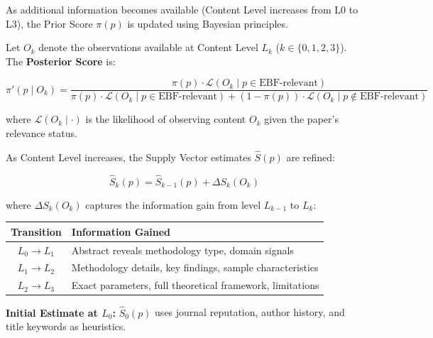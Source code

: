 As additional information becomes available (Content Level increases from L0 to L3),
the Prior Score $\pi(p)$ is updated using Bayesian principles.

\begin{tcolorbox}[colback=blue!5!white, colframe=blue!75!black,
    title=\textbf{Definition 9: Posterior Score}]

Let $O_k$ denote the observations available at Content Level $L_k$ ($k \in \{0,1,2,3\}$).
The \textbf{Posterior Score} is:

\begin{equation}
\pi'(p \mid O_k) = \frac{\pi(p) \cdot \mathcal{L}(O_k \mid p \in \text{EBF-relevant})}
                        {\pi(p) \cdot \mathcal{L}(O_k \mid p \in \text{EBF-relevant}) +
                         (1-\pi(p)) \cdot \mathcal{L}(O_k \mid p \notin \text{EBF-relevant})}
\end{equation}

where $\mathcal{L}(O_k \mid \cdot)$ is the likelihood of observing content $O_k$ given
the paper's relevance status.
\end{tcolorbox}

\begin{tcolorbox}[colback=blue!5!white, colframe=blue!75!black,
    title=\textbf{Definition 10: Supply Vector Update Function}]

As Content Level increases, the Supply Vector estimates $\hat{S}(p)$ are refined:

\begin{equation}
\hat{S}_k(p) = \hat{S}_{k-1}(p) + \Delta S_k(O_k)
\end{equation}

where $\Delta S_k(O_k)$ captures the information gain from level $L_{k-1}$ to $L_k$:

\begin{center}
\renewcommand{\arraystretch}{1.2}
\begin{tabular}{@{}cl@{}}
\toprule
\textbf{Transition} & \textbf{Information Gained} \\
\midrule
$L_0 \to L_1$ & Abstract reveals methodology type, domain signals \\
$L_1 \to L_2$ & Methodology details, key findings, sample characteristics \\
$L_2 \to L_3$ & Exact parameters, full theoretical framework, limitations \\
\bottomrule
\end{tabular}
\end{center}

\textbf{Initial Estimate at $L_0$:} $\hat{S}_0(p)$ uses journal reputation, author history,
and title keywords as heuristics.
\end{tcolorbox}

